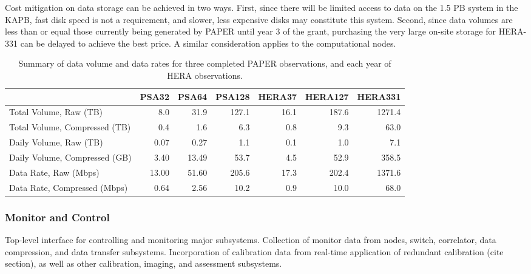 \documentclass[preprint]{aastex}
\begin{document}
Cost mitigation on data storage can be achieved in two ways. First,
since there will be limited access to data on the 1.5 PB system in the
KAPB, fast disk speed is not a requirement, and slower, less expensive
disks may constitute this system.  Second, since data volumes are less
than or equal those currently being generated by PAPER until year 3 of
the grant, purchasing the very large on-site storage for HERA-331 can
be delayed to achieve the best price.  A similar consideration applies
to the computational nodes.

%
%

\begin{table}
\begin{tabular}{| l | r r r r r r |}
    \hline
                                      & PSA32 & PSA64 & PSA128 & HERA37 & HERA127 & HERA331 \\ \hline
               Total Volume, Raw (TB) &   8.0 &  31.9 &  127.1 &   16.1 &   187.6 &  1271.4 \\
        Total Volume, Compressed (TB) &   0.4 &   1.6 &    6.3 &    0.8 &     9.3 &    63.0 \\
               Daily Volume, Raw (TB) &  0.07 &  0.27 &    1.1 &    0.1 &     1.0 &     7.1 \\
        Daily Volume, Compressed (GB) &  3.40 & 13.49 &   53.7 &    4.5 &    52.9 &   358.5 \\
                Data Rate, Raw (Mbps) & 13.00 & 51.60 &  205.6 &   17.3 &   202.4 &  1371.6 \\
         Data Rate, Compressed (Mbps) &  0.64 &  2.56 &   10.2 &    0.9 &    10.0 &    68.0 \\
    \hline
\end{tabular}
\caption{\small
\label{tab:data_vol} Summary of data volume and data rates for three completed PAPER observations, and each year of HERA observations.}
\end{table}

\subsubsection{Monitor and Control}


Top-level interface for controlling and monitoring major subsystems. 
Collection of monitor data from nodes, switch, correlator, data compression, and data transfer subsystems.
Incorporation of calibration data from real-time application of redundant calibration (cite section), as well as
other calibration, imaging, and assessment subsystems.
\end{document}
